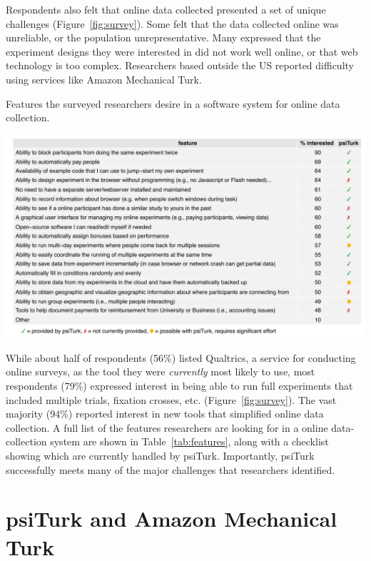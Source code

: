 \documentclass[twocolumn]{svjour3}          %
\newcommand{\psiturk}[0]{\textsf{psiTurk}}
\begin{document}
Respondents also felt that online data collected presented a set of unique challenges 
(Figure~\ref{fig:survey}).  Some felt that the data collected online was unreliable, or the
population unrepresentative. Many expressed that the experiment designs they were interested in did
not work well online, or that web technology is too complex. Researchers based
outside the US reported difficulty using services like Amazon Mechanical Turk.

\begin{table}[tp]
\centering
\caption{Features the surveyed researchers desire in a software system for online data collection.}
\includegraphics[width=\textwidth]{figures/featuresTable.pdf}
\label{tab:features}
\end{table}


While about half of respondents (56\%) listed Qualtrics, a service for conducting online surveys, 
as the tool they were \emph{currently} most likely to use, most respondents (79\%) expressed interest in 
being able to run full experiments that included multiple trials, fixation crosses, etc.
(Figure~\ref{fig:survey}). The vast majority (94\%) reported interest in new tools that 
simplified online data collection. A full list of the features researchers are looking for in a 
online data-collection system are shown in Table~\ref{tab:features}, along with a checklist 
showing which are currently handled by \psiturk{}.  Importantly, \psiturk{} successfully
meets many of the major challenges that researchers identified.


\section{\psiturk{} and Amazon Mechanical Turk} 
\end{document}
